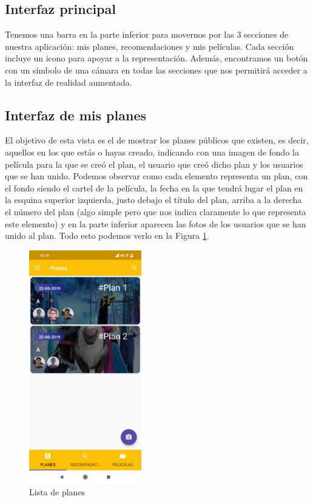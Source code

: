 \subsection{Interfaz principal}
\label{makereference3.4.1}
Tenemos una barra en la parte inferior para movernos por las 3 secciones de nuestra aplicación: mis planes, recomendaciones y mis películas.
Cada sección incluye un icono para apoyar a la representación.
Además, encontramos un botón con un símbolo de una cámara en todas las secciones que nos permitirá acceder a la interfaz de realidad aumentada.
\subsection{Interfaz de mis planes}
\label{makereference3.4.2}
El objetivo de esta vista es el de mostrar los planes públicos que existen, es decir, aquellos en los que estás o hayas creado, indicando con una imagen de fondo la película para la que se creó el plan, el usuario
que creó dicho plan y los usuarios que se han unido. 
Podemos observar como cada elemento representa un plan, con el fondo siendo el cartel de la película, la fecha en la que tendrá lugar el plan en la esquina superior izquierda,
justo debajo el título del plan, arriba a la derecha el número del plan (algo simple pero que nos indica
claramente lo que representa este elemento) y en la parte inferior aparecen las fotos de los usuarios que se han unido al plan.
Todo esto podemos verlo en la Figura \ref{fig:listaPlanes}.
\begin{figure}[H]
    \centering
    \includegraphics[height=4in]{figures/chapter-3/plan-list.jpg}
    \caption{Lista de planes}
    \label{fig:listaPlanes}
\end{figure}

